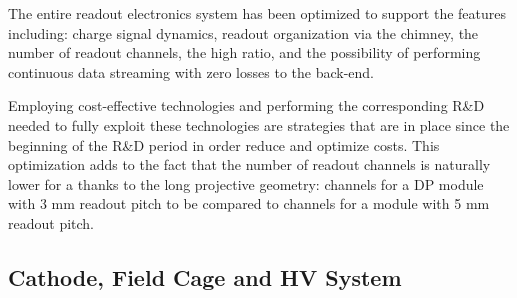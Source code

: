 
The entire readout electronics system has been optimized to support the \dual features including: charge signal dynamics, readout organization via the chimney, the number of readout channels, the high  ratio, and the possibility of performing continuous data streaming with zero losses to the  back-end. 


Employing cost-effective technologies and performing the corresponding R\&D needed to fully exploit these technologies are strategies that are in place since the beginning of the R\&D period in order reduce and optimize costs.   
This optimization adds to the fact that the number of readout channels is naturally lower for a  thanks to the long projective geometry: \dpnumcrpch channels for a DP module with 3 mm readout pitch to be compared to \spnumch channels for a \single module with 5 mm readout pitch. %


\subsection{Cathode, Field Cage and HV System}
\label{v4:fddp-ov:cathode}

